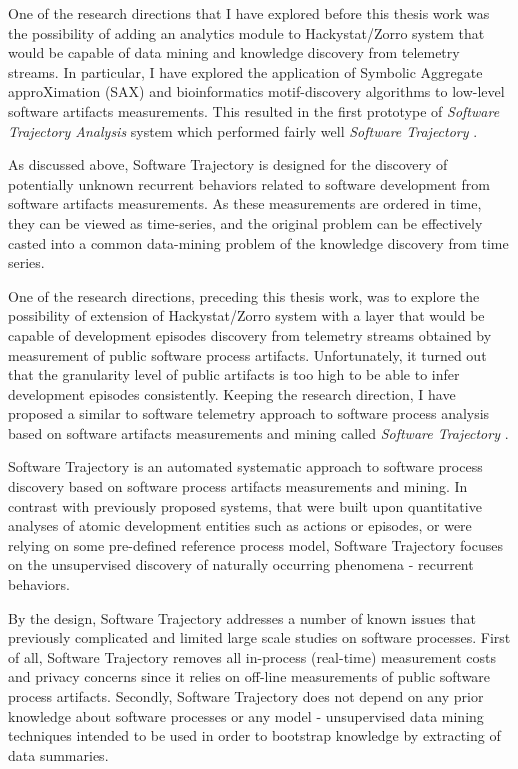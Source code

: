 One of the research directions that I have explored before this thesis work was the possibility of adding an analytics 
module to Hackystat/Zorro system that would be capable of data mining and knowledge discovery from telemetry streams. 
In particular, I have explored the application of Symbolic Aggregate approXimation (SAX) and bioinformatics 
motif-discovery algorithms to low-level software artifacts measurements. 
This resulted in the first prototype of \textit{Software Trajectory Analysis} system which performed fairly well 
\textit{Software Trajectory} \cite{csdl2-10-09}. 


As discussed above, Software Trajectory is designed for the discovery of potentially unknown recurrent 
behaviors related to software development from software artifacts measurements. As these measurements 
are ordered in time, they can be viewed as time-series, and the original problem can be effectively casted
into a common data-mining problem of the knowledge discovery from time series.

One of the research directions, preceding this thesis work, was to explore the possibility of extension of 
Hackystat/Zorro system with a layer that would be capable of development episodes discovery from telemetry 
streams obtained by measurement of public software process artifacts. 
Unfortunately, it turned out that the granularity level of public artifacts is too high to be able to infer development 
episodes consistently.
Keeping the research direction, I have proposed a similar to software telemetry approach to software process analysis 
based on software artifacts measurements and mining called \textit{Software Trajectory} \cite{csdl2-10-09}. 

Software Trajectory is an automated systematic approach to software process discovery based on software process 
artifacts measurements and mining. In contrast with previously proposed systems, that were built upon quantitative 
analyses of atomic development entities such as actions or episodes, or were relying on some pre-defined reference 
process model, Software Trajectory focuses on the unsupervised discovery of naturally occurring phenomena 
- recurrent behaviors. 

By the design, Software Trajectory addresses a number of known issues that previously complicated and limited 
large scale studies on software processes.
First of all, Software Trajectory removes all in-process (real-time) measurement costs and privacy concerns since 
it relies on off-line measurements of public software process artifacts. 
Secondly, Software Trajectory does not depend on any prior knowledge about software processes or any model - 
unsupervised data mining techniques intended to be used in order to bootstrap knowledge by extracting of data 
summaries. 

